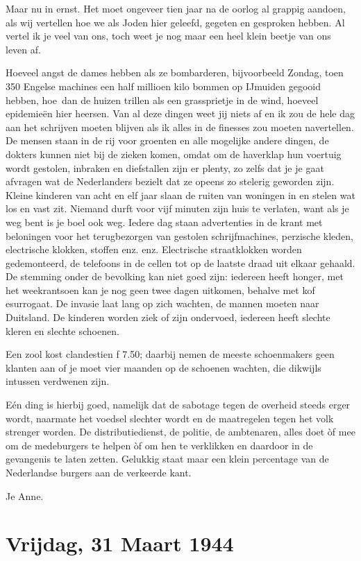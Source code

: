\documentclass{book}
\begin{document}
Maar nu in ernst. Het moet ongeveer tien jaar na de oorlog al grappig aandoen,
als wij vertellen hoe we als Joden hier geleefd, gegeten en gesproken hebben. Al
vertel ik je veel van ons, toch weet je nog maar een heel klein beetje van ons
leven af.

Hoeveel angst de dames hebben als ze bombarderen, bijvoorbeeld Zondag, toen 350
Engelse machines een half millioen kilo bommen op IJmuiden gegooid hebben,
hoe~dan de huizen trillen als een grassprietje in de wind, hoeveel epidemieën
hier heersen. Van al deze dingen weet jij niets af en ik zou de hele dag aan het
schrijven moeten blijven als ik alles in de finesses zou moeten navertellen. De
mensen staan in de rij voor groenten en alle mogelijke andere dingen, de dokters
kunnen niet bij de zieken komen, omdat om de haverklap hun voertuig wordt
gestolen, inbraken en diefstallen zijn er plenty, zo zelfs dat je je gaat
afvragen wat de Nederlanders bezielt dat ze opeens zo stelerig geworden zijn.
Kleine kinderen van acht en elf jaar slaan de ruiten van woningen in en stelen
wat los en vast zit. Niemand durft voor vijf minuten zijn huis te verlaten, want
als je weg bent is je boel ook weg. Iedere dag staan advertenties in de krant
met beloningen voor het terugbezorgen van gestolen schrijfmachines, perzische
kleden, electrische klokken, stoffen enz. enz. Electrische straatklokken worden
gedemonteerd, de telefoons in de cellen tot op de laatste draad uit elkaar
gehaald. De stemming onder de bevolking kan niet goed zijn: iedereen heeft
honger, met het weekrantsoen kan je nog geen twee dagen uitkomen, behalve met
kof esurrogaat. De invasie laat lang op zich wachten, de mannen moeten naar
Duitsland. De kinderen worden ziek of zijn ondervoed, iedereen heeft slechte
kleren en slechte schoenen.

Een zool kost clandestien ƒ 7.50; daarbij nemen de meeste schoenmakers geen
klanten aan of je moet vier maanden op de schoenen wachten, die dikwijls
intussen verdwenen zijn.

Eén ding is hierbij goed, namelijk dat de sabotage tegen de overheid steeds
erger wordt, naarmate het voedsel slechter wordt en de maatregelen tegen het
volk strenger worden. De distributiedienst, de politie, de ambtenaren, alles
doet òf mee om de medeburgers te helpen òf om hen te verklikken en daardoor in
de gevangenis te laten zetten.  Gelukkig staat maar een klein percentage van de
Nederlandse burgers aan de verkeerde kant.

Je Anne.

\section*{Vrijdag, 31 Maart 1944}
\end{document}
